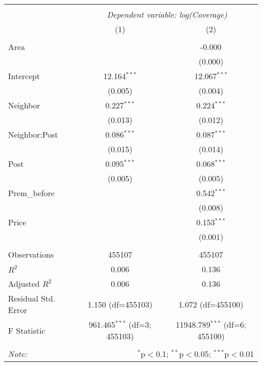 
\begin{tabular}{@{\extracolsep{5pt}}lcc}
\\[-1.8ex]\hline
\hline \\[-1.8ex]
& \multicolumn{2}{c}{\textit{Dependent variable: log(Coverage)}} \
\cr \cline{2-3}
\\[-1.8ex] & (1) & (2) \\
\hline \\[-1.8ex]
 Area & & -0.000$^{}$ \\
& & (0.000) \\
 Intercept & 12.164$^{***}$ & 12.067$^{***}$ \\
& (0.005) & (0.004) \\
 Neighbor & 0.227$^{***}$ & 0.224$^{***}$ \\
& (0.013) & (0.012) \\
 Neighbor:Post & 0.086$^{***}$ & 0.087$^{***}$ \\
& (0.015) & (0.014) \\
 Post & 0.095$^{***}$ & 0.068$^{***}$ \\
& (0.005) & (0.005) \\
 Prem\_before & & 0.542$^{***}$ \\
& & (0.008) \\
 Price & & 0.153$^{***}$ \\
& & (0.001) \\
\hline \\[-1.8ex]
 Observations & 455107 & 455107 \\
 $R^2$ & 0.006 & 0.136 \\
 Adjusted $R^2$ & 0.006 & 0.136 \\
 Residual Std. Error & 1.150 (df=455103) & 1.072 (df=455100) \\
 F Statistic & 961.465$^{***}$ (df=3; 455103) & 11948.789$^{***}$ (df=6; 455100) \\
\hline
\hline \\[-1.8ex]
\textit{Note:} & \multicolumn{2}{r}{$^{*}$p$<$0.1; $^{**}$p$<$0.05; $^{***}$p$<$0.01} \\
\end{tabular}
